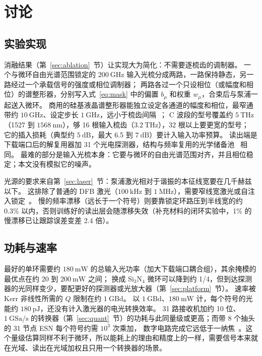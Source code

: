 \section{讨论}\label{sec:discussion}

\subsection{实验实现}

消融结果（第~\ref{sec:ablation}~节）让实现大为简化：不需要逐梳齿的调制器。
一个与微环自由光谱范围锁定的 $200~\mathrm{GHz}$ 输入光梳分成两路，一路保持静态，另一路经过一个承载信号的强度或相位调制器；
两路各过一个只设相位（或幅度和相位）的谱整形器，分别写入式~\eqref{eq:mask} 中的偏置 $b_\mu$ 和权重 $w_\mu$，合束后与泵浦一起送入微环。
商用的硅基液晶谱整形器能独立设定各通道的幅度和相位，最窄通带约 $10~\mathrm{GHz}$、设定步长 $1~\mathrm{GHz}$，远小于梳齿间隔~\cite{coherent_waveshaper}；
C 波段的型号覆盖约 $5~\mathrm{THz}$（1527 到 $1568~\mathrm{nm}$），够 16 根输入梳齿（$3.2~\mathrm{THz}$），32 根以上要更宽的型号；
它的插入损耗（典型约 $5~\mathrm{dB}$，最大 6.5 到 $7~\mathrm{dB}$）要计入输入功率预算。
读出端是下载端口后的解复用器加 31 个光电探测器，结构与频率复用的光学储备池~\cite{butschek2020,lupo2023} 相同。
最难的部分是输入光梳本身：它要与微环的自由光谱范围对齐，并且相位稳定；本文没有模拟它的噪声。

光源的要求来自第~\ref{sec:laser}~节：泵浦激光相对于谐振的本征线宽要在几千赫兹以下。
这排除了普通的 DFB 激光（$100~\mathrm{kHz}$ 到 $1~\mathrm{MHz}$），需要窄线宽激光或自注入锁定~\cite{liang2015,kondratiev2017,shen2020}。
慢的频率漂移（远长于一个符号）则要靠锁定环路压到半线宽的约 0.3\% 以内，否则训练好的读出层会随漂移失效（补充材料的闭环实验中，1\% 的慢漂移已让跟踪误差变差 2.4 倍）。

\subsection{功耗与速率}

最好的单环需要约 $180~\mathrm{mW}$ 的总输入光功率（加大下载端口耦合组），其余掩模的最优点在约 20 到 $200~\mathrm{mW}$ 之间；
换成 Si$_3$N$_4$ 微环可以降到约 1/4，但到达探测器的光同样变少，要配更好的探测器或光放大器（第~\ref{sec:platform}~节）。
速率被 Kerr 非线性所需的 $Q$ 限制在约 $1~\mathrm{GBd}$。
以 $1~\mathrm{GBd}$、$180~\mathrm{mW}$ 计，每个符号的光能约 $180~\mathrm{pJ}$，还没有计入激光器的电光转换效率。
31 路接收机加约 10 位、$1~\mathrm{GSa/s}$ 的转换器（第~\ref{sec:quant}~节）的功耗与此同量级或更高；而带 8 个抽头的 31 节点 ESN 每个符号约需 $10^{3}$ 次乘加，
数字电路完成它远低于一纳焦~\cite{horowitz2014}。这个量级估算同样不利于微环，所以能耗上的理由和精度上的一样，需要信号本来就在光域、读出在光域加权且只用一个转换器的场景。

